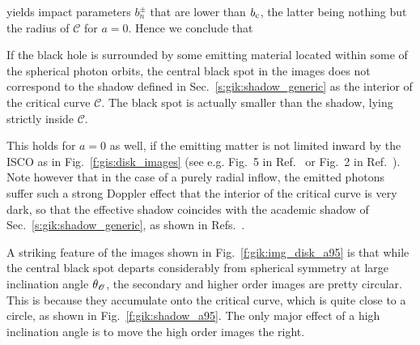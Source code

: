 yields impact parameters $b_n^\pm$ that are lower than $b_{\rm c}$, the latter being
nothing but the radius of $\mathscr{C}$ for $a=0$.
Hence we conclude that
\begin{greybox}
If the black hole is surrounded by some emitting material
located within some of the spherical photon orbits,
the central black spot in the images does not correspond to
the shadow defined in Sec.~\ref{s:gik:shadow_generic} as the interior of the critical curve $\mathscr{C}$. The black spot is actually smaller than the shadow, lying strictly inside $\mathscr{C}$.
\end{greybox}
This holds for $a=0$ as well, if the emitting matter is not limited inward by the ISCO
as in Fig.~\ref{f:gis:disk_images} (see e.g. Fig.~5 in Ref.~\cite{GrallHW19}
or Fig.~2 in Ref.~\cite{VinceWAGLPG21}). Note however that in the case of a
purely radial inflow, the emitted photons suffer such a strong Doppler effect that
the interior of the critical curve is very dark, so that the effective shadow
coincides with the academic shadow of Sec.~\ref{s:gik:shadow_generic},
as shown in Refs.~\cite{FalckMA00,NarayJG19}.


A striking feature of the images shown in Fig.~\ref{f:gik:img_disk_a95} is that
while the central black spot departs considerably from spherical symmetry at large
inclination angle $\theta_{\mathscr{O}}$, the secondary and higher order images are pretty
circular. This is because they accumulate onto the critical curve, which is
quite close to a circle, as shown in Fig.~\ref{f:gik:shadow_a95}. The only
major effect of a high inclination angle is to move the high order images
the right.

